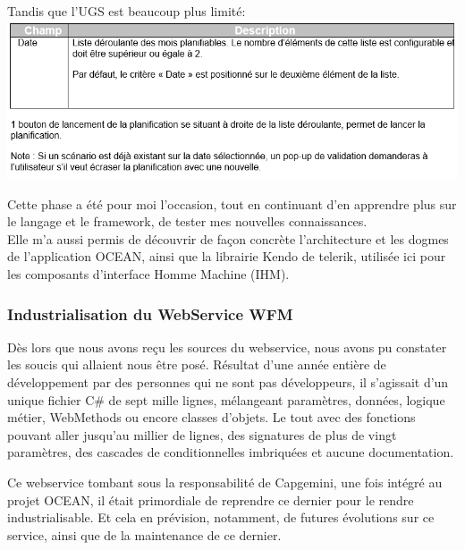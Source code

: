 \documentclass{rapport}
\begin{document}
Tandis que l'UGS est beaucoup plus limité:\\
\includegraphics[width=.95\textwidth]{fig/fig19_PlanoHUGSFonct.png}

Cette phase a été pour moi l'occasion, tout en continuant d'en apprendre plus sur le langage et le framework, de tester mes nouvelles connaissances.\\
Elle m'a aussi permis de découvrir de façon concrète l'architecture et les dogmes de l'application OCEAN, ainsi que la librairie Kendo de telerik, utilisée ici pour les composants d'interface Homme Machine (IHM).\\

\subsubsection{Industrialisation du WebService WFM}

Dès lors que nous avons reçu les sources du webservice, nous avons pu constater les soucis qui allaient nous être posé. Résultat d'une année entière de développement par des personnes qui ne sont pas développeurs, il s'agissait d'un unique fichier C\# de sept mille lignes, mélangeant paramètres, données, logique métier, WebMethods ou encore classes d'objets. Le tout avec des fonctions pouvant aller jusqu'au millier de lignes, des signatures de plus de vingt paramètres, des cascades de conditionnelles imbriquées et aucune documentation.\\


Ce webservice tombant sous la responsabilité de Capgemini, une fois intégré au projet OCEAN, il était primordiale de reprendre ce dernier pour le rendre industrialisable. Et cela en prévision, notamment, de futures évolutions sur ce service, ainsi que de la maintenance de ce dernier.\\
\end{document}
